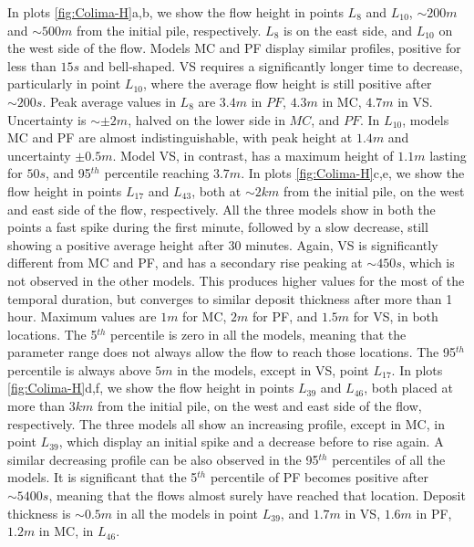 \documentclass{article}
\begin{document}
In plots \ref{fig:Colima-H}a,b, we show the flow height in points $L_8$ and $L_{10}$, $\sim 200 m$ and $\sim 500 m$ from the initial pile, respectively. $L_8$ is on the east side, and $L_{10}$ on the west side of the flow. Models MC and PF display similar profiles, positive for less than $15 s$ and bell-shaped. VS requires a significantly longer time to decrease, particularly in point $L_{10}$, where the average flow height is still positive after $\sim 200 s$. Peak average values in $L_8$ are $3.4 m$ in $PF$, $4.3 m$ in MC, $4.7 m$ in VS. Uncertainty is $\sim \pm 2 m$, halved on the lower side in $MC$, and $PF$. In $L_{10}$, models MC and PF are almost indistinguishable, with peak height at $1.4 m$ and uncertainty $\pm 0.5 m$. Model VS, in contrast, has a maximum height of $1.1 m$ lasting for $50s$, and 95$^{th}$ percentile reaching $3.7 m$. In plots \ref{fig:Colima-H}c,e, we show the flow height in points $L_{17}$ and $L_{43}$, both at $\sim 2 km$ from the initial pile, on the west and east side of the flow, respectively. All the three models show in both the points a fast spike during the first minute, followed by a slow decrease, still showing a positive average height after 30 minutes. Again, VS is significantly different from MC and PF, and has a secondary rise peaking at $\sim 450 s$, which is not observed in the other models. This produces higher values for the most of the temporal duration, but converges to similar deposit thickness after more than 1 hour. Maximum values are $1 m$ for MC, $2 m$ for PF, and $1.5 m$ for VS, in both locations. The 5$^{th}$ percentile is zero in all the models, meaning that the parameter range does not always allow the flow to reach those locations. The 95$^{th}$ percentile is always above $5m$ in the models, except in VS, point $L_{17}$. In plots \ref{fig:Colima-H}d,f, we show the flow height in points $L_{39}$ and $L_{46}$, both placed at more than $3 km$ from the initial pile, on the west and east side of the flow, respectively. The three models all show an increasing profile, except in MC, in point $L_{39}$, which display an initial spike and a decrease before to rise again. A similar decreasing profile can be also observed in the 95$^{th}$ percentiles of all the models. It is significant that the 5$^{th}$ percentile of PF becomes positive after $\sim 5400 s$, meaning that the flows almost surely have reached that location. Deposit thickness is $\sim 0.5 m$ in all the models in point $L_{39}$, and $1.7 m$ in VS, $1.6 m$ in PF, $1.2 m$ in MC, in $L_{46}$.
\end{document}
